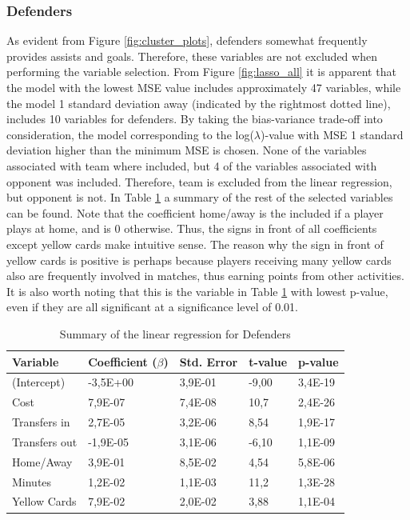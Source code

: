 \subsubsection{Defenders}
As evident from Figure \ref{fig:cluster_plots}, defenders somewhat frequently provides assists and goals. Therefore, these variables are not excluded when performing the variable selection. From Figure \ref{fig:lasso_all} it is apparent that the model with the lowest MSE value includes approximately 47 variables, while the model 1 standard deviation away (indicated by the rightmost dotted line), includes 10 variables for defenders. By taking the bias-variance trade-off into consideration, the model corresponding to the log($\lambda$)-value with MSE 1 standard deviation higher than the minimum MSE is chosen. None of the variables associated with team where included, but 4 of the variables associated with opponent was included. Therefore, team is excluded from the linear regression, but opponent is not. In Table \ref{tab:coef_DEF} a summary of the rest of the selected variables can be found. Note that the coefficient home/away is the included if a player plays at home, and is 0 otherwise. Thus, the signs in front of all coefficients except yellow cards make intuitive sense. The reason why the sign in front of yellow cards is positive is perhaps because players receiving many yellow cards also are frequently involved in matches, thus earning points from other activities. It is also worth noting that this is the variable in Table \ref{tab:coef_DEF} with lowest p-value, even if they are all significant at a significance level of 0.01.

\begin{table}[H]
\centering
\begin{tabular}{|l|l|l|l|l|}
\hline
Variable      & Coefficient ($\beta$) & Std. Error & t-value & p-value \\ \hline
(Intercept)   & -3,5E+00     & 3,9E-01    & -9,00    & 3,4E-19 \\
Cost          & 7,9E-07      & 7,4E-08    & 10,7    & 2,4E-26 \\
Transfers in  & 2,7E-05      & 3,2E-06    & 8,54     & 1,9E-17 \\
Transfers out & -1,9E-05     & 3,1E-06    & -6,10    & 1,1E-09 \\
Home/Away     & 3,9E-01      & 8,5E-02    & 4,54     & 5,8E-06 \\
Minutes       & 1,2E-02      & 1,1E-03    & 11,2    & 1,3E-28 \\
Yellow Cards  & 7,9E-02      & 2,0E-02    & 3,88     & 1,1E-04 \\
\hline
\end{tabular}
\caption{Summary of the linear regression for Defenders}
\label{tab:coef_DEF}
\end{table}

